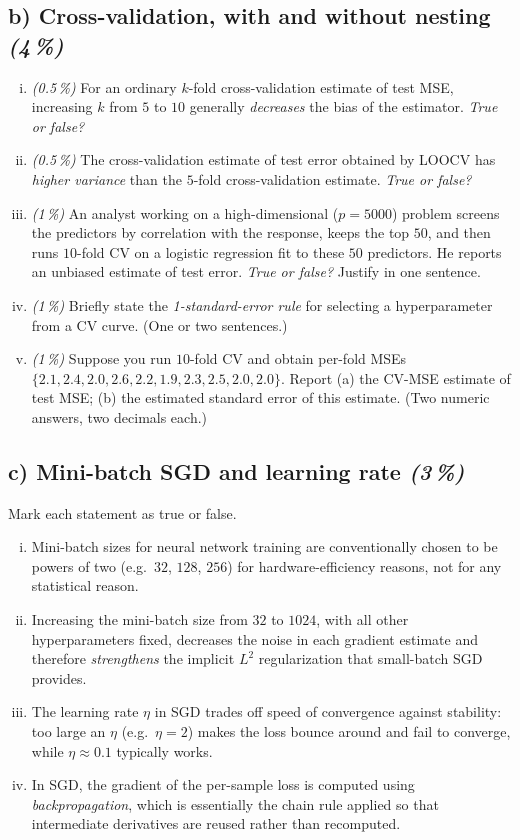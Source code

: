 \documentclass[11pt,a4paper]{article}
\newcommand{\subpoints}[1]{\textit{(#1\,\%)}}
\begin{document}
\subsection*{b) Cross-validation, with and without nesting \subpoints{4}}
\begin{enumerate}[(i)]
  \item \subpoints{0.5} For an ordinary $k$-fold cross-validation estimate of test MSE, increasing $k$ from $5$ to $10$ generally \emph{decreases} the bias of the estimator. \emph{True or false?}
  \item \subpoints{0.5} The cross-validation estimate of test error obtained by LOOCV has \emph{higher variance} than the $5$-fold cross-validation estimate. \emph{True or false?}
  \item \subpoints{1} An analyst working on a high-dimensional ($p=5000$) problem screens the predictors by correlation with the response, keeps the top $50$, and then runs $10$-fold CV on a logistic regression fit to these $50$ predictors. He reports an unbiased estimate of test error. \emph{True or false?} Justify in one sentence.
  \item \subpoints{1} Briefly state the \emph{1-standard-error rule} for selecting a hyperparameter from a CV curve. (One or two sentences.)
  \item \subpoints{1} Suppose you run $10$-fold CV and obtain per-fold MSEs $\{2.1, 2.4, 2.0, 2.6, 2.2, 1.9, 2.3, 2.5, 2.0, 2.0\}$. Report (a) the CV-MSE estimate of test MSE; (b) the estimated standard error of this estimate. (Two numeric answers, two decimals each.)
\end{enumerate}

\subsection*{c) Mini-batch SGD and learning rate \subpoints{3}}
Mark each statement as true or false.
\begin{enumerate}[(i)]
  \item Mini-batch sizes for neural network training are conventionally chosen to be powers of two (e.g.\ $32$, $128$, $256$) for hardware-efficiency reasons, not for any statistical reason.
  \item Increasing the mini-batch size from $32$ to $1024$, with all other hyperparameters fixed, decreases the noise in each gradient estimate and therefore \emph{strengthens} the implicit $L^2$ regularization that small-batch SGD provides.
  \item The learning rate $\eta$ in SGD trades off speed of convergence against stability: too large an $\eta$ (e.g.\ $\eta=2$) makes the loss bounce around and fail to converge, while $\eta\approx 0.1$ typically works.
  \item In SGD, the gradient of the per-sample loss is computed using \emph{backpropagation}, which is essentially the chain rule applied so that intermediate derivatives are reused rather than recomputed.
\end{enumerate}
\end{document}
